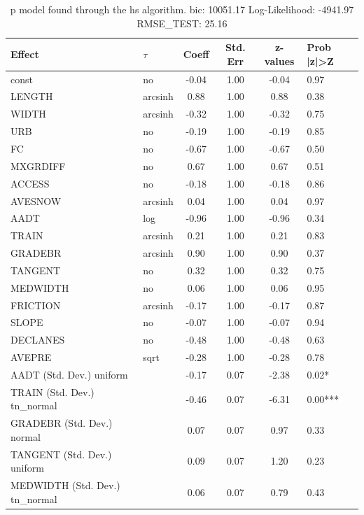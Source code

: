 \begin{table}
	\caption{p model found through the hs algorithm. bic: 10051.17 Log-Likelihood: -4941.97 RMSE_TEST: 25.16}
	\begin{center}
		\begin{tabular}{|l|l|c|c|c|l|}
			\hline
			Effect & $\tau$ & Coeff & Std. Err & z-values & Prob |z|>Z \\
			\hline
			const & no & -0.04 & 1.00 & -0.04 & 0.97 \\
			\hline
			LENGTH & arcsinh & 0.88 & 1.00 & 0.88 & 0.38 \\
			\hline
			WIDTH & arcsinh & -0.32 & 1.00 & -0.32 & 0.75 \\
			\hline
			URB & no & -0.19 & 1.00 & -0.19 & 0.85 \\
			\hline
			FC & no & -0.67 & 1.00 & -0.67 & 0.50 \\
			\hline
			MXGRDIFF & no & 0.67 & 1.00 & 0.67 & 0.51 \\
			\hline
			ACCESS & no & -0.18 & 1.00 & -0.18 & 0.86 \\
			\hline
			AVESNOW & arcsinh & 0.04 & 1.00 & 0.04 & 0.97 \\
			\hline
			AADT & log & -0.96 & 1.00 & -0.96 & 0.34 \\
			\hline
			TRAIN & arcsinh & 0.21 & 1.00 & 0.21 & 0.83 \\
			\hline
			GRADEBR & arcsinh & 0.90 & 1.00 & 0.90 & 0.37 \\
			\hline
			TANGENT & no & 0.32 & 1.00 & 0.32 & 0.75 \\
			\hline
			MEDWIDTH & no & 0.06 & 1.00 & 0.06 & 0.95 \\
			\hline
			FRICTION & arcsinh & -0.17 & 1.00 & -0.17 & 0.87 \\
			\hline
			SLOPE & no & -0.07 & 1.00 & -0.07 & 0.94 \\
			\hline
			DECLANES & no & -0.48 & 1.00 & -0.48 & 0.63 \\
			\hline
			AVEPRE & sqrt & -0.28 & 1.00 & -0.28 & 0.78 \\
			\hline
			AADT (Std. Dev.) uniform &  & -0.17 & 0.07 & -2.38 & 0.02* \\
			\hline
			TRAIN (Std. Dev.) tn_normal &  & -0.46 & 0.07 & -6.31 & 0.00*** \\
			\hline
			GRADEBR (Std. Dev.) normal &  & 0.07 & 0.07 & 0.97 & 0.33 \\
			\hline
			TANGENT (Std. Dev.) uniform &  & 0.09 & 0.07 & 1.20 & 0.23 \\
			\hline
			MEDWIDTH (Std. Dev.) tn_normal &  & 0.06 & 0.07 & 0.79 & 0.43 \\

\end{tabular}
\end{center}
\end{table}

